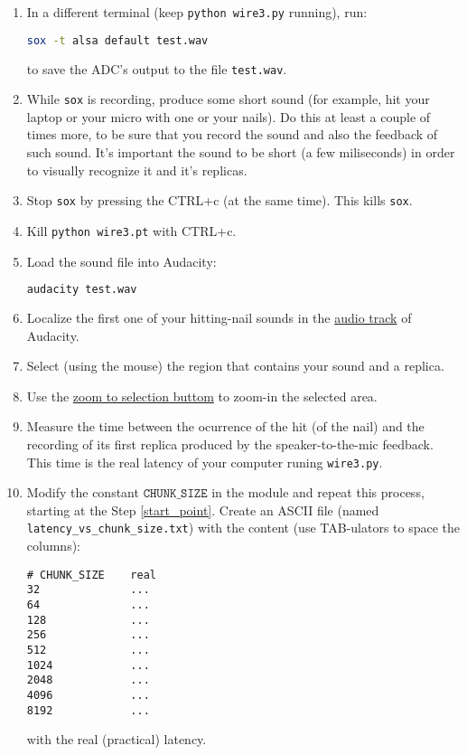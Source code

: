 \begin{enumerate}
\item In a different terminal (keep \texttt{python wire3.py} running),
  run:

  \begin{lstlisting}[language=Bash]
sox -t alsa default test.wav
  \end{lstlisting}

  to save the ADC's output to the file \texttt{test.wav}.

\item While \texttt{sox} is recording, produce some short sound (for
  example, hit your laptop or your micro with one or your nails). Do
  this at least a couple of times more, to be sure that you record the
  sound and also the feedback of such sound. It's important the sound
  to be short (a few miliseconds) in order to visually recognize it
  and it's replicas.

\item Stop \texttt{sox} by pressing the CTRL+c (at the same
  time). This kills \texttt{sox}.

\item Kill \texttt{python wire3.pt} with CTRL+c.

\item Load the sound file into Audacity:
    
  \begin{lstlisting}[language=Bash]
audacity test.wav
  \end{lstlisting}

\item Localize the first one of your hitting-nail sounds in the
  \href{https://manual.audacityteam.org/man/audio_tracks.html}{audio
    track} of Audacity.

\item Select (using the mouse) the region that contains your sound and
  a replica.

\item Use the
  \href{https://manual.audacityteam.org/man/edit_toolbar.html#zoom_to_selection}{zoom
    to selection buttom} to zoom-in the selected area.

\item Measure the time between the ocurrence of the hit (of the nail)
  and the recording of its first replica produced by the
  speaker-to-the-mic feedback. This time is the real latency of your
  computer runing \texttt{wire3.py}.

\item Modify the constant $\mathtt{CHUNK\_SIZE}$ in the module and
  repeat this process, starting at the Step \ref{start_point}. Create
  an ASCII file (named \texttt{latency\_vs\_chunk\_size.txt}) with the
  content (use TAB-ulators to space the columns):
\begin{verbatim}
# CHUNK_SIZE    real
32              ...
64              ...
128             ...
256             ...
512             ...
1024            ...
2048            ...
4096            ...
8192            ...
\end{verbatim}
with the real (practical) latency.
\end{enumerate}

